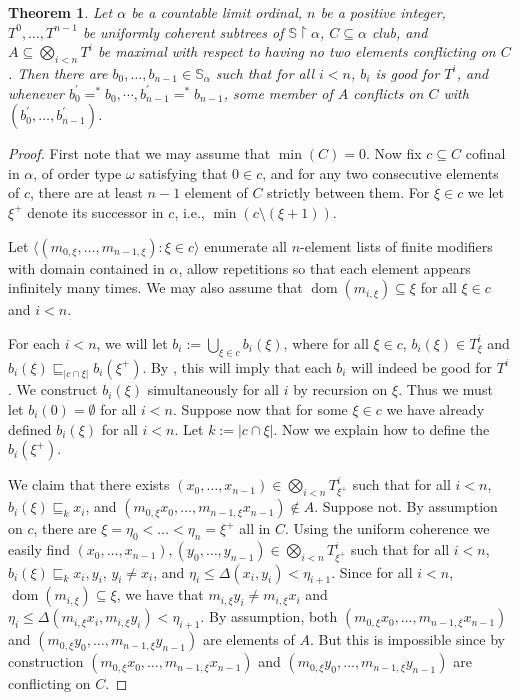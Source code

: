 \documentclass[a4paper,noamsfonts]{amsart}
\newtheorem{theorem}{Theorem}[section]
\theoremstyle{definition}
\newcommand{\seb}{\subseteq}
\newcommand{\setm}{\setminus}
\newcommand{\es}{\emptyset}
\newcommand{\tleq}{\sqsubseteq}
\newcommand{\res}{\!\upharpoonright\!}
\newcommand{\tup}[1]{\langle#1\rangle}
\newcommand{\1}{\mathbbm{1}}
\renewcommand{\S}{\mathbb{S}}
\DeclareMathOperator{\dom}{dom}
\begin{document}
\begin{theorem}\label{lem:hard-ext}
  Let $\alpha$ be a countable limit ordinal,
  $n$ be a positive integer, $T^{0},\dots,T^{n-1}$ be uniformly coherent
  subtrees of $\S \res \alpha$, $C \seb \alpha$ club,
  and $A \seb \bigotimes_{i < n}T^{i}$ be maximal with respect
  to having no two elements conflicting on $C$. Then there are
  $b_{0},\dots,b_{n-1} \in \S_{\alpha}$ such that
  for all $i < n$, $b_{i}$ is good for $T^{i}$,
  and whenever
  $b^{'}_{0} =^{*} b_{0}, \cdots, b^{'}_{n-1} =^{*} b_{n-1}$, some member
  of $A$ conflicts on $C$ with
  $(b_{0}^{'},\dots,b_{n-1}^{'})$.
\end{theorem}
\begin{proof}
  First note that we may assume that $\min(C) = 0$.
  Now fix
  $c \seb C$ cofinal in $\alpha$, of order type $\omega$
  satisfying that $0 \in c$, and for any two consecutive elements of $c$,
  there are at least $n-1$ element of $C$ strictly between them.
  For $\xi \in c$
  we let $\xi^{+}$ denote its successor in $c$, i.e., $\min(c \setm (\xi +1))$.

  Let $\tup{(m_{0,\xi},\dots,m_{n-1,\xi}) : \xi \in c}$ enumerate all
  $n$-element lists
  of finite modifiers with domain contained in $\alpha$,
  allow repetitions so that each element
  appears infinitely many times. We may also assume that
  $\dom(m_{i,\xi}) \seb \xi$ for all $\xi \in c$ and $i < n$.

  For each $i < n$, we will let $b_{i} := \bigcup_{\xi \in c}b_{i}(\xi)$,
  where for all $\xi \in c$, $b_{i}(\xi) \in T^{i}_{\xi}$ and
  $b_{i}(\xi) \tleq_{|c \cap \xi|} b_{i}(\xi^{+})$. By ,
  this will imply that each $b_{i}$ will indeed be good for $T^{i}$.
  We construct
  $b_{i}(\xi)$ simultaneously for all $i$ by recursion on $\xi$.
  Thus we must let $b_{i}(0) = \es$ for all $i < n$. Suppose now that
  for some $\xi \in c$ we have already defined
  $b_{i}(\xi)$ for all $i < n$. Let $k := |c \cap \xi|$. Now we explain
  how to define the $b_{i}(\xi^{+})$.

  We claim that
  there exists
  $(x_{0},\dots,x_{n-1}) \in \bigotimes_{i <n}T^{i}_{\xi^{+}}$ such that
  for all $i <n$, $b_{i}(\xi) \tleq_{k} x_{i}$, and
  $(m_{0,\xi}x_{0},\dots,m_{n-1,\xi}x_{n-1}) \notin A$.
  Suppose not. By assumption on $c$,
  there are $\xi = \eta_{0} < \dots < \eta_{n} = \xi^{+}$ all in
  $C$.
  Using the uniform coherence we easily find
  $(x_{0},\dots,x_{n-1}),\allowbreak (y_{0},\dots,y_{n-1})
  \in \bigotimes_{i <n}T^{i}_{\xi^{+}}$ such that for all $i < n$,
  $b_{i}(\xi) \tleq_{k} x_{i},y_{i}$,
  $y_{i} \neq x_{i}$, and
  $\eta_{i} \le \Delta(x_{i},y_{i}) < \eta_{i+1}$.
  Since for all $i < n$, $\dom(m_{i,\xi}) \seb \xi$, we
  have that $m_{i,\xi}y_{i} \neq m_{i,\xi}x_{i}$ and
  $\eta_{i} \le \Delta(m_{i,\xi}x_{i},m_{i,\xi}y_{i}) < \eta_{i+1}$.
  By assumption, both
  $(m_{0,\xi}x_{0},\dots,m_{n-1,\xi}x_{n-1})$ and $(m_{0,\xi}y_{0},\dots,m_{n-1,\xi}y_{n-1})$
  are elements of $A$. But this is impossible since by construction
  $(m_{0,\xi}x_{0},\dots,m_{n-1,\xi}x_{n-1})$ and $(m_{0,\xi}y_{0},\dots,m_{n-1,\xi}y_{n-1})$
  are conflicting on $C$.
  

\end{proof}
\end{document}
